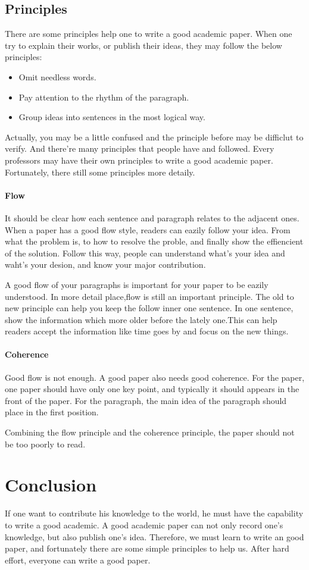 \documentclass{article}
\begin{document}
\subsection{Principles}
There are some principles help one to write a good academic paper.
When one try to explain their works, or publish their ideas, 
they may follow the below principles:
\begin{itemize}
    \item Omit needless words.
    \item Pay attention to the rhythm of the paragraph.
    \item Group ideas into sentences in the most logical way.
\end{itemize}
Actually, you may be a little confused and the principle before may be difficlut to verify.
And there're many principles that people have and followed. 
Every professors may have their own principles to write a good
academic paper.
Fortunately, there still some principles more detaily.


\paragraph{Flow}
It should be clear how each sentence and paragraph relates to the adjacent ones. \cite{PeopleCanRead}
When a paper has a good flow style, readers can eazily follow your idea.
From what the problem is, to how to resolve the proble, and finally show the effiencient of the solution.
Follow this way, people can understand what's your idea and waht's your desion, and know your major contribution.

A good flow of your paragraphs is important for your paper to be eazily understood.
In more detail place,flow is still an important principle. 
The old to new principle can help you keep the follow inner one sentence.
In one sentence, show the information which more older before the lately one.This can help readers accept the information like time goes by and focus on the new things.

\paragraph{Coherence}
Good flow is not enough.
A good paper also needs good coherence.
For the paper, one paper should have only one key point,
and typically it should appears in the front of the paper.
For the paragraph,
the main idea of the paragraph should place in the first position.

Combining the flow principle and the coherence principle, the paper should not be too poorly to read.
\section{Conclusion}
If one want to contribute his knowledge to the world, he must have the capability to write a good academic.
A good academic paper can not only record one's knowledge, but also publish one's idea.
Therefore, we must learn to write an good paper,
and fortunately there are some simple principles to help us.
After hard effort, everyone can write a good paper.

\printbibliography
\end{document}
